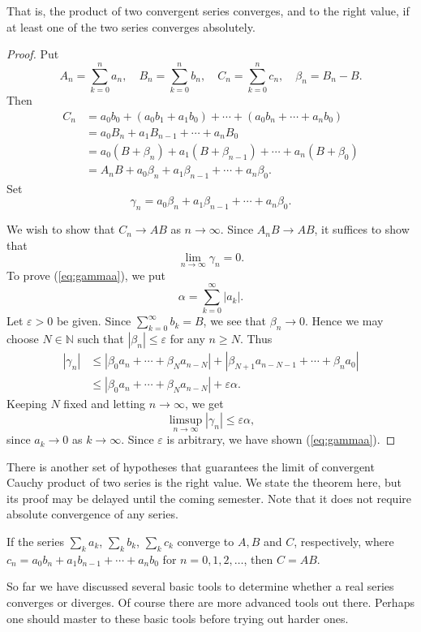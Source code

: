 \documentclass[11pt]{article}
\begin{document}
That is, the product of two convergent series converges, and to the right value, if at least one of the two series converges absolutely.

\begin{proof}
  Put
  \[
    A_n = \sum_{k=0}^n a_n, \quad
    B_n = \sum_{k=0}^n b_n, \quad
    C_n = \sum_{k=0}^n c_n, \quad
    \beta_n = B_n - B.
  \]
  Then
  \begin{align*}
    C_n &= a_0 b_0 + (a_0 b_1 + a_1 b_0) + \cdots + (a_0 b_n + \cdots + a_n b_0) \\
    &= a_0 B_n + a_1 B_{n-1} + \cdots + a_n B_0 \\
    &= a_0 (B + \beta_n) + a_1 (B + \beta_{n-1}) + \cdots + a_n (B + \beta_0) \\
    &= A_n B + a_0 \beta_n + a_1 \beta_{n-1} + \cdots + a_n \beta_0.
  \end{align*}
  Set
  \[
    \gamma_n = a_0 \beta_n + a_1 \beta_{n-1} + \cdots + a_n \beta_0.
  \]

  We wish to show that $C_n \to AB$ as $n \to \infty$.  Since $A_n B \to AB$, it suffices to show that
  \begin{equation}
    \label{eq:gammaa}
    \lim_{n\to\infty} \gamma_n = 0.
  \end{equation}
  To prove (\ref{eq:gammaa}), we put
  \[
    \alpha = \sum_{k=0}^\infty |a_k|.
  \]
  Let $\varepsilon > 0$ be given.  Since $\sum_{k=0}^\infty b_k = B$, we see that $\beta_n \to 0$.  Hence we may choose $N \in \mathbb{N}$ such that $|\beta_n| \leqslant \varepsilon$ for any $n \geqslant N$.  Thus
  \begin{align*}
    |\gamma_n| &\leqslant |\beta_0 a_n + \cdots + \beta_N a_{n-N}| + |\beta_{N+1} a_{n-N-1} + \cdots + \beta_n a_0| \\
    &\leqslant |\beta_0 a_n + \cdots + \beta_N a_{n-N}| + \varepsilon \alpha.
  \end{align*}
  Keeping $N$ fixed and letting $n \to \infty$, we get
  \[
    \limsup_{n\to\infty} |\gamma_n| \leqslant \varepsilon \alpha,
  \]
  since $a_k \to 0$ as $k \to \infty$.  Since $\varepsilon$ is arbitrary, we have shown (\ref{eq:gammaa}).
\end{proof}

There is another set of hypotheses that guarantees the limit of convergent Cauchy product of two series is the right value.
We state the theorem here, but its proof may be delayed until the coming semester.
Note that it does not require absolute convergence of any series.

\begin{thm}
  If the series $\sum_k a_k$, $\sum_k b_k$, $\sum_k c_k$ converge to $A, B$ and $C$, respectively, where $c_n = a_0 b_n + a_1 b_{n-1} + \cdots + a_n b_0$ for $n = 0,1,2,\dots$, then $C = AB$.
\end{thm}

\medskip
So far we have discussed several basic tools to determine whether a real series converges or diverges.
Of course there are more advanced tools out there.
Perhaps one should master to these basic tools before trying out harder ones.
\end{document}
